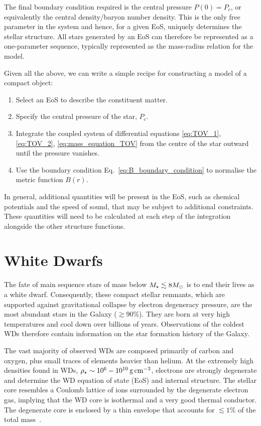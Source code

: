 The final boundary condition required is the central pressure $P(0) = P_c$, or equivalently the central density/baryon number density. This is the only free parameter in the system and hence, for a given EoS, uniquely determines the stellar structure. All stars generated by an EoS can therefore be represented as a one-parameter sequence, typically represented as the mass-radius relation for the model. 

Given all the above, we can write a simple recipe for constructing a model of a compact object:
\begin{enumerate}
    \item Select an EoS to describe the constituent matter.
    \item Specify the central pressure of the star, $P_c$.
    \item Integrate the coupled system of differential equations \ref{eq:TOV_1}, \ref{eq:TOV_2}, \ref{eq:mass_equation_TOV} from the centre of the star outward until the pressure vanishes.
    \item Use the boundary condition Eq.~\ref{eq:B_boundary_condition} to normalise the metric function $B(r)$. 
\end{enumerate}
In general, additional quantities will be present in the EoS, such as chemical potentials and the speed of sound, that may be subject to additional constraints. These quantities will need to be calculated at each step of the integration alongside the other structure functions. 

\section{White Dwarfs}

The fate of main sequence stars of mass below $M_\star \lesssim 8 M_\odot$ is to end their lives as a white dwarf. Consequently, these compact stellar remnants, which are supported against gravitational collapse by electron degeneracy pressure, are the most abundant stars in the Galaxy ($\gtrsim 90\%$). They are born at very high temperatures and cool down over billions of years. Observations of the coldest WDs therefore contain information on the star formation history of the Galaxy.

The vast majority of observed WDs are composed primarily of carbon and oxygen, plus small traces of elements heavier than helium. 
At the extremely high densities found in WDs, $\rho_\star\sim 10^6-10^{10}{\rm \,g}{\rm \,cm}^{-3}$, electrons are strongly degenerate and determine the WD equation of state (EoS) and internal structure.  The stellar core resembles a Coulomb lattice of ions surrounded by the degenerate electron gas, implying that the WD core is isothermal and a very good thermal conductor. 
The degenerate core is enclosed by a thin envelope that accounts for $\lesssim 1\%$  of the total mass~\cite{Fontaine_apr_Potentialwhitedwarf}. 


